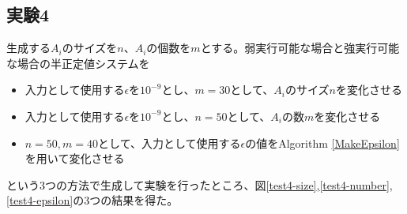 \subsection{実験4}
生成する$A_i$のサイズを$n$、$A_i$の個数を$m$とする。弱実行可能な場合と強実行可能な場合\cite{FeasibleAnalysis}の半正定値システムを
\begin{itemize}
  \item 入力として使用する$\epsilon$を$10^{-9}$とし、$m = 30$として、$A_i$のサイズ$n$を変化させる
  \item 入力として使用する$\epsilon$を$10^{-9}$とし、$n = 50$として、$A_i$の数$m$を変化させる
  \item $n = 50, m = 40$として、入力として使用する$\epsilon$の値をAlgorithm \ref{MakeEpsilon}を用いて変化させる
\end{itemize}
という3つの方法で生成して実験を行ったところ、図\ref{test4-size},\ref{test4-number},\ref{test4-epsilon}の3つの結果を得た。
